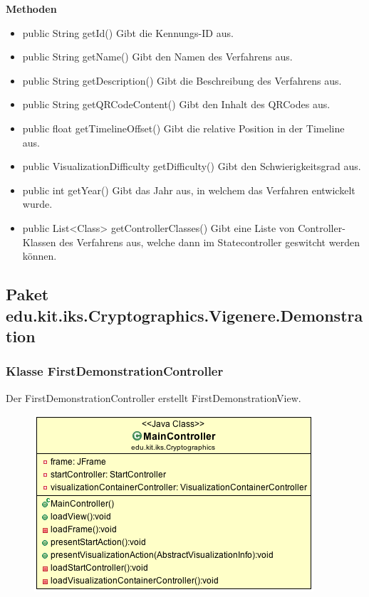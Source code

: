 \documentclass{article}
\begin{document}
      \textbf{Methoden}
      \begin{itemize}
        \item public String getId() \newline
        Gibt die Kennungs-ID aus.
        \item public String getName() \newline
        Gibt den Namen des Verfahrens aus.
        \item public String getDescription() \newline
        Gibt die Beschreibung des Verfahrens aus.
        \item public String getQRCodeContent() \newline
        Gibt den Inhalt des QRCodes aus.
        \item public float getTimelineOffset() \newline
        Gibt die relative Position in der Timeline aus.
        \item public VisualizationDifficulty getDifficulty() \newline
        Gibt den Schwierigkeitsgrad aus.
        \item public int getYear() \newline
        Gibt das Jahr aus, in welchem das Verfahren entwickelt wurde.
        \item public List<Class> getControllerClasses() \newline
        Gibt eine Liste von Controller-Klassen des Verfahrens aus, welche dann im Statecontroller geswitcht werden können.
      \end{itemize}

  \subsection{Paket edu.kit.iks.Cryptographics.Vigenere.Demonstration}
    \subsubsection{Klasse FirstDemonstrationController}
      Der FirstDemonstrationController erstellt FirstDemonstrationView.
      \begin{figure}[H]
        \centering
        \includegraphics[width=\textwidth]{resources/edu-kit-iks-Cryptographics-MainController}
      \end{figure}
\end{document}
